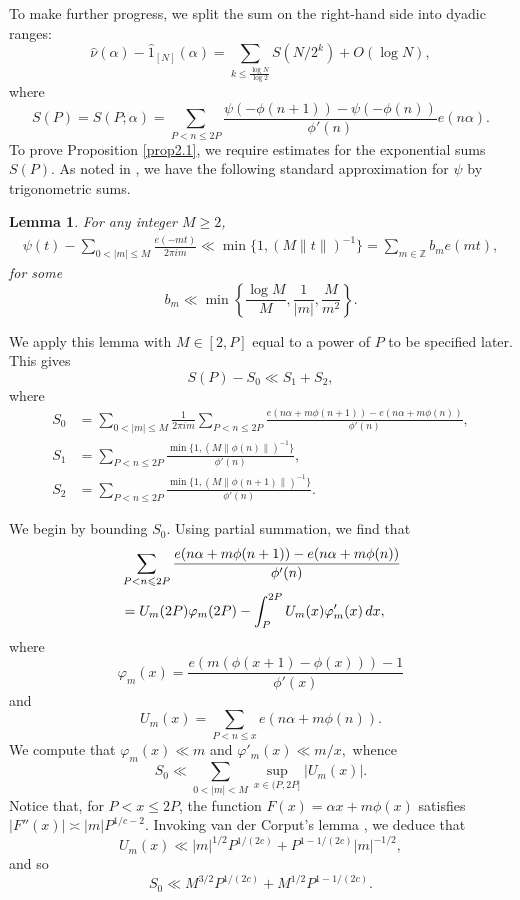 \documentclass[12pt, reqno]{amsart}
\newtheorem{lemma}[thm]{Lemma}
\theoremstyle{definition}
\theoremstyle{remark}
\numberwithin{equation}{section}
\theoremstyle{definition}
\def\alp{{\alpha}} \def\bfalp{{\boldsymbol \alpha}}
\def\le{\leqslant} \def\ge{\geqslant} \def\pleq{\preccurlyeq} \def\ple{\prec}
\def\d{{\,{\rm d}}}
\def \bZ {\mathbb Z}
\begin{document}
To make further progress, we split the sum on the right-hand side into dyadic ranges:
\begin{equation}
\label{eqn2.2}
\hat{\nu}(\alpha) - \hat{1}_{[N]}(\alpha) = \sum_{k \le \frac{\log N}{\log 2}} S(N/2^k) + O(\log N),
\end{equation}
where
\[
S(P) = S(P;\alpha) = \sum_{P < n \le 2P} 
\frac{\psi(-\phi(n+1)) - \psi(-\phi(n))}{\phi'(n)}
e(n\alp).
\]
To prove Proposition \ref{prop2.1}, we require estimates for the exponential sums $S(P)$. As noted in \cite[\S2]{HB1983}, we have the following standard approximation for $\psi$ by trigonometric sums.

\begin{lemma}
\label{lem2.3}
For any integer $M \ge 2$,
\begin{align*}
\psi(t) - \sum_{0 < |m| \le M} \frac{e(-mt)}{2 \pi i m}  \ll
\min \{1, (M\| t \|)^{-1} \} = \sum_{m\in\bZ} b_{m}e(mt),
\end{align*}
for some 
\[
b_{m} \ll \min \left \{ \frac{\log M}{M}, \frac{1}{|m|}, \frac{M}{m^{2}} \right \}.
\]
\end{lemma}

We apply this lemma with $M\in[2,P]$ equal to a power of $P$ to be specified later. This gives
\[
S(P) - S_0 \ll S_1 + S_2,
\]
where
\begin{align*}
S_0 &= \sum_{0 < |m| \le M} \frac1{2 \pi i m} \sum_{P < n \le 2P} \frac{e(n \alp + m \phi(n+1)) - e(n \alp + m \phi(n))}{\phi'(n)}, \\
S_1 &= \sum_{P < n \le 2P } 
\frac{\min\{1, (M \|\phi(n)\|)^{-1} \}}{\phi'(n)}, \\
S_2 &= \sum_{P < n \le 2P}  
\frac{\min\{1, (M \|\phi(n+1)\|)^{-1} \}}{\phi'(n)}.
\end{align*}

We begin by bounding $S_0$. Using partial summation, we find that
\begin{align*}
&\sum_{P < n \le 2P} \frac{e(n \alp + m \phi(n+1)) - e(n \alp + m \phi(n))}{\phi'(n)}\\&= U_{m}(2P)\varphi_{m}(2P) - \int_{P}^{2P} U_{m}(x) \varphi'_{m}(x) \d x, \end{align*}
where
\[
\varphi_{m}(x) = \frac{e(m(\phi(x+1) -\phi(x)))- 1}{\phi'(x)}
\]
and
\[
U_{m}(x) = \sum_{P < n \le x} e(n \alp + m\phi(n)).
\]
We compute that 
$
\varphi_{m}(x) \ll m
$ 
and
$
\varphi'_{m}(x) \ll m/x,
$
whence
\[
S_0 \ll 
\sum_{0 < |m| < M} \sup_{x \in (P,2P]} \left| U_{m}(x)\right|.
\]
Notice that, for $P < x \le 2P$, the function $F(x)=\alp x+ m\phi(x)$ satisfies $|F''(x)| \asymp |m|P^{1/c-2}$. Invoking van der Corput's lemma \cite[Lemma~3.1]{Mir2015}, we deduce that
\[U_{m}(x) \ll |m|^{1/2} P^{1/(2c)} + P^{1-1/(2c)} |m|^{-1/2},\]
and so
\[
S_{0} \ll M^{3/2} P^{1/(2c)} + M^{1/2} P^{1-1/(2c)}.
\]
\end{document}
